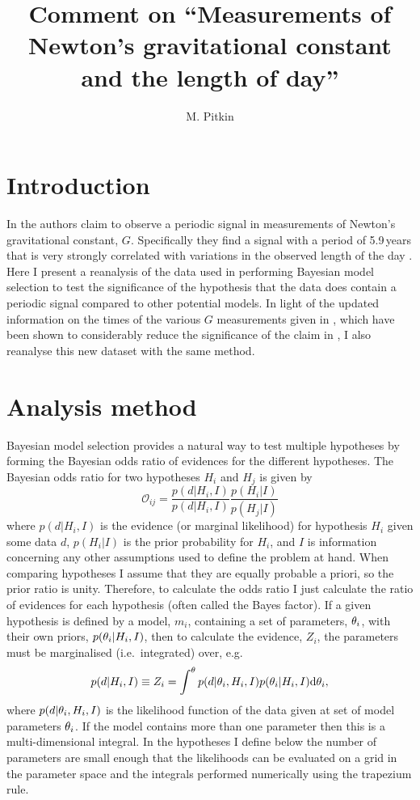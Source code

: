 \documentclass[page-classic]{epl2}
\title{Comment on ``Measurements of Newton's gravitational constant and the length of day''}
\author{M. Pitkin}
\institute{
  SUPA, School of Physics \& Astronomy, University of Glasgow, Glasgow, G12 8QQ, UK
}
\begin{document}
\maketitle

\section{Introduction}

In \cite{2015EL....11010002A} the authors claim to observe a periodic signal in measurements of
Newton's gravitational constant, $G$. Specifically they find a signal with a period of 5.9\,years that
is very strongly correlated with variations in the observed length of the day
\cite{2013Natur.499..202H}. Here I present a reanalysis of the data used in \cite{2015EL....11010002A}
performing Bayesian model selection to test the significance of the hypothesis that the data does contain
a periodic signal compared to other potential models. In light of the updated information on the times
of the various $G$ measurements given in \cite{2015arXiv150501774S}, which have been shown to considerably
reduce the significance of the claim in \cite{2015EL....11010002A}, I also reanalyse this new dataset with
the same method.

\section{Analysis method}

Bayesian model selection provides a natural way to test multiple hypotheses by forming the Bayesian odds ratio of
evidences for the different hypotheses. The Bayesian odds ratio for two hypotheses $H_i$ and $H_j$ is given by
\begin{equation}
 \mathcal{O}_{ij} = \frac{p(d|H_i,I)}{p(d|H_i,I)}\frac{p(H_i|I)}{p(H_j|I)}
\end{equation}
where $p(d|H_i,I)$ is the evidence (or marginal likelihood) for hypothesis $H_i$ given some data $d$,
$p(H_i|I)$ is the prior probability for $H_i$, and $I$ is information concerning any other assumptions used to
define the problem at hand. When comparing hypotheses I assume that they are equally
probable a priori, so the prior ratio is unity. Therefore, to calculate the odds ratio I just calculate
the ratio of evidences for each hypothesis (often called the Bayes factor). If a given hypothesis is defined
by a model, $m_i$, containing a set of parameters, $\mathbf{\theta}_i$, with their own priors,
$p(\mathbf{\theta}_i|H_i,I)$, then to calculate the evidence, $Z_i$, the parameters must be marginalised (i.e.\ integrated)
over, e.g.
\begin{equation}\label{eq:evidence}
 p(d|H_i,I) \equiv Z_i = \int^{\mathbf{\theta}} p(d|\mathbf{\theta}_i,H_i,I) p(\mathbf{\theta}_i|H_i,I) {\rm d}\mathbf{\theta}_i,
\end{equation}
where $p(d|\mathbf{\theta}_i,H_i,I)$ is the likelihood function of the data given at set of model parameters $\mathbf{\theta}_i$. If
the model contains more than one parameter then this is a multi-dimensional integral. In the hypotheses I define
below the number of parameters are small enough that the likelihoods can be evaluated on a grid in the parameter
space and the integrals performed numerically using the trapezium rule.
\end{document}
